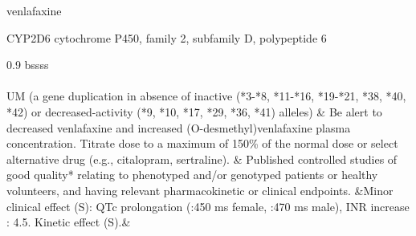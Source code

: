 \documentclass{resume} %
\begin{document}
\begin{rSection}{ venlafaxine }
\begin{rSubsection}{ CYP2D6 }{ cytochrome P450, family 2, subfamily D, polypeptide 6 }{}{}
\begin{center}
\begin{tabularx}{0.9\textwidth}{ bssss }
		\hline \\
		\vspace{1pt}\\
		         UM (a gene duplication in absence of inactive (*3-*8, *11-*16, *19-*21, *38, *40, *42) or decreased-activity (*9, *10, *17, *29, *36, *41) alleles) & Be alert to decreased venlafaxine and increased (O-desmethyl)venlafaxine plasma concentration. Titrate dose to a maximum of 150\% of the normal dose or select alternative drug (e.g., citalopram, sertraline). & Published controlled studies of good quality* relating to phenotyped and/or genotyped patients or healthy volunteers, and having relevant pharmacokinetic or clinical endpoints. &Minor clinical effect (S): QTc prolongation (:450 ms female, :470 ms male),  INR increase : 4.5.  Kinetic effect (S).&
\\
		\end{tabularx}
		\end{center}
		\normalsize
		\vspace{10pt}
		        


\end{rSubsection}


\end{rSection}
\end{document}
